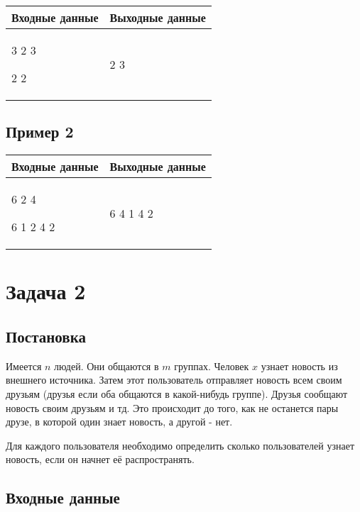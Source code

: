 \documentclass{extarticle}
\begin{document}
\begin{table}[H]
\begin{center}
\begin{tabular}{|m{4cm}|m{4cm}|}
\hline
Входные данные & Выходные данные \\ \hline
3 2 3

2 2
&
2 3
\\ \hline
\end{tabular}
\end{center}
\end{table}

\subsection*{Пример 2}
\label{sec:org2aeecb4}

\begin{table}[H]
\begin{center}
\begin{tabular}{|m{4cm}|m{4cm}|}
\hline
Входные данные & Выходные данные \\ \hline
6 2 4

6 1 2 4 2
&
6 4 1 4 2
\\ \hline
\end{tabular}
\end{center}
\end{table}

\pagebreak
\section*{Задача 2}
\label{sec:orgef181bd}
\subsection*{Постановка}
\label{sec:orgad8a20e}

Имеется \(n\) людей. Они общаются в \(m\) группах.
Человек \(x\) узнает новость из внешнего источника.
Затем этот пользователь отправляет новость всем своим друзьям
(друзья если оба общаются в какой-нибудь группе).
Друзья сообщают новость своим друзьям и тд.
Это происходит до того, как не останется пары друзе, в которой один
знает новость, а другой - нет.

Для каждого пользователя необходимо определить сколько пользователей узнает
новость, если он начнет её распространять.

\subsection*{Входные данные}
\label{sec:orgb72ba50}
\end{document}
